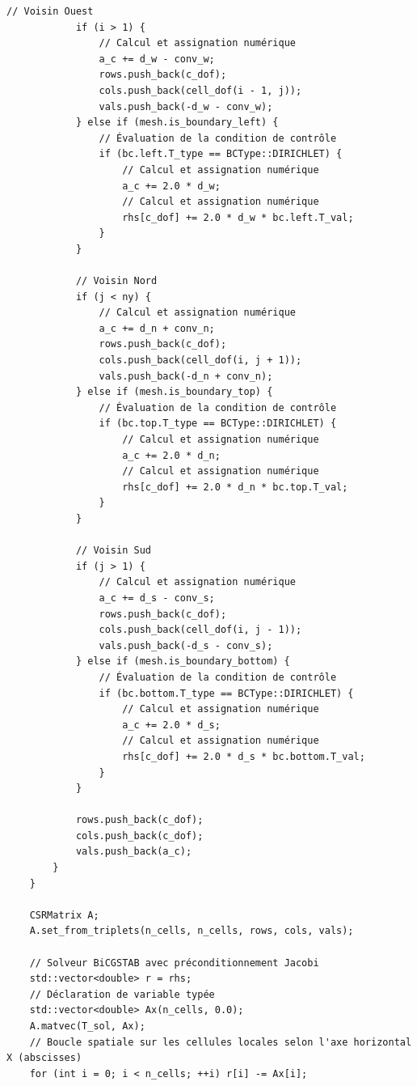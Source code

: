 \documentclass[10pt,a4paper,oneside]{book}
\begin{document}
\begin{lstlisting}[language={[11]C++}]
            // Voisin Ouest
            if (i > 1) {
                // Calcul et assignation numérique
                a_c += d_w - conv_w;
                rows.push_back(c_dof);
                cols.push_back(cell_dof(i - 1, j));
                vals.push_back(-d_w - conv_w);
            } else if (mesh.is_boundary_left) {
                // Évaluation de la condition de contrôle
                if (bc.left.T_type == BCType::DIRICHLET) {
                    // Calcul et assignation numérique
                    a_c += 2.0 * d_w;
                    // Calcul et assignation numérique
                    rhs[c_dof] += 2.0 * d_w * bc.left.T_val;
                }
            }

            // Voisin Nord
            if (j < ny) {
                // Calcul et assignation numérique
                a_c += d_n + conv_n;
                rows.push_back(c_dof);
                cols.push_back(cell_dof(i, j + 1));
                vals.push_back(-d_n + conv_n);
            } else if (mesh.is_boundary_top) {
                // Évaluation de la condition de contrôle
                if (bc.top.T_type == BCType::DIRICHLET) {
                    // Calcul et assignation numérique
                    a_c += 2.0 * d_n;
                    // Calcul et assignation numérique
                    rhs[c_dof] += 2.0 * d_n * bc.top.T_val;
                }
            }

            // Voisin Sud
            if (j > 1) {
                // Calcul et assignation numérique
                a_c += d_s - conv_s;
                rows.push_back(c_dof);
                cols.push_back(cell_dof(i, j - 1));
                vals.push_back(-d_s - conv_s);
            } else if (mesh.is_boundary_bottom) {
                // Évaluation de la condition de contrôle
                if (bc.bottom.T_type == BCType::DIRICHLET) {
                    // Calcul et assignation numérique
                    a_c += 2.0 * d_s;
                    // Calcul et assignation numérique
                    rhs[c_dof] += 2.0 * d_s * bc.bottom.T_val;
                }
            }

            rows.push_back(c_dof);
            cols.push_back(c_dof);
            vals.push_back(a_c);
        }
    }

    CSRMatrix A;
    A.set_from_triplets(n_cells, n_cells, rows, cols, vals);

    // Solveur BiCGSTAB avec préconditionnement Jacobi
    std::vector<double> r = rhs;
    // Déclaration de variable typée
    std::vector<double> Ax(n_cells, 0.0);
    A.matvec(T_sol, Ax);
    // Boucle spatiale sur les cellules locales selon l'axe horizontal X (abscisses)
    for (int i = 0; i < n_cells; ++i) r[i] -= Ax[i];


\end{lstlisting}
\end{document}

